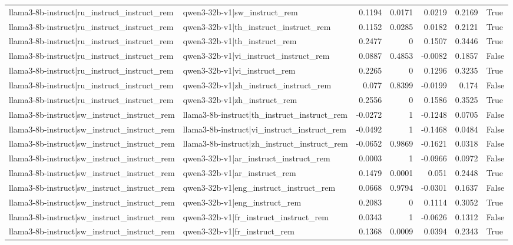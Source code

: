 \begin{table}
\begin{tabular}{l l r r r r l}
llama3-8b-instruct|ru_instruct_instruct_rem & qwen3-32b-v1|sw_instruct_rem & 0.1194 & 0.0171 & 0.0219 & 0.2169 & True \\
llama3-8b-instruct|ru_instruct_instruct_rem & qwen3-32b-v1|th_instruct_instruct_rem & 0.1152 & 0.0285 & 0.0182 & 0.2121 & True \\
llama3-8b-instruct|ru_instruct_instruct_rem & qwen3-32b-v1|th_instruct_rem & 0.2477 & 0 & 0.1507 & 0.3446 & True \\
llama3-8b-instruct|ru_instruct_instruct_rem & qwen3-32b-v1|vi_instruct_instruct_rem & 0.0887 & 0.4853 & -0.0082 & 0.1857 & False \\
llama3-8b-instruct|ru_instruct_instruct_rem & qwen3-32b-v1|vi_instruct_rem & 0.2265 & 0 & 0.1296 & 0.3235 & True \\
llama3-8b-instruct|ru_instruct_instruct_rem & qwen3-32b-v1|zh_instruct_instruct_rem & 0.077 & 0.8399 & -0.0199 & 0.174 & False \\
llama3-8b-instruct|ru_instruct_instruct_rem & qwen3-32b-v1|zh_instruct_rem & 0.2556 & 0 & 0.1586 & 0.3525 & True \\
llama3-8b-instruct|sw_instruct_instruct_rem & llama3-8b-instruct|th_instruct_instruct_rem & -0.0272 & 1 & -0.1248 & 0.0705 & False \\
llama3-8b-instruct|sw_instruct_instruct_rem & llama3-8b-instruct|vi_instruct_instruct_rem & -0.0492 & 1 & -0.1468 & 0.0484 & False \\
llama3-8b-instruct|sw_instruct_instruct_rem & llama3-8b-instruct|zh_instruct_instruct_rem & -0.0652 & 0.9869 & -0.1621 & 0.0318 & False \\
llama3-8b-instruct|sw_instruct_instruct_rem & qwen3-32b-v1|ar_instruct_instruct_rem & 0.0003 & 1 & -0.0966 & 0.0972 & False \\
llama3-8b-instruct|sw_instruct_instruct_rem & qwen3-32b-v1|ar_instruct_rem & 0.1479 & 0.0001 & 0.051 & 0.2448 & True \\
llama3-8b-instruct|sw_instruct_instruct_rem & qwen3-32b-v1|eng_instruct_instruct_rem & 0.0668 & 0.9794 & -0.0301 & 0.1637 & False \\
llama3-8b-instruct|sw_instruct_instruct_rem & qwen3-32b-v1|eng_instruct_rem & 0.2083 & 0 & 0.1114 & 0.3052 & True \\
llama3-8b-instruct|sw_instruct_instruct_rem & qwen3-32b-v1|fr_instruct_instruct_rem & 0.0343 & 1 & -0.0626 & 0.1312 & False \\
llama3-8b-instruct|sw_instruct_instruct_rem & qwen3-32b-v1|fr_instruct_rem & 0.1368 & 0.0009 & 0.0394 & 0.2343 & True \\

\end{tabular}
\end{table}
